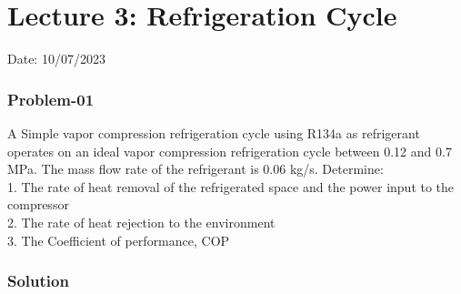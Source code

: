 \documentclass{article}
\begin{document}
\section{Lecture 3: Refrigeration Cycle}
\hfill Date: 10/07/2023

\subsubsection*{Problem-01}
A Simple vapor compression refrigeration cycle using R134a as 
refrigerant operates on an ideal vapor compression refrigeration cycle 
between 0.12 and 0.7 MPa. The mass flow rate of the refrigerant is 
0.06 kg/s. Determine:\\
1. The rate of heat removal of the refrigerated space and the 
power input to the compressor \\
2. The rate of heat rejection to the environment \\ 
3. The Coefficient of performance, COP

\subsubsection*{Solution}
\end{document}
